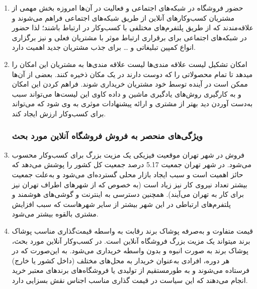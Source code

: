 \documentclass[14pt]{article}
\begin{document}
\begin{flushright}
\begin{enumerate}
\item حضور فروشگاه در شبکه‌های اجتماعی و فعالیت در آن‌ها
\newline
امروزه بخش مهمی از مشتریان کسب‌وکارهای آنلاین از طریق شبکه‌های اجتماعی فراهم می‌شوند و علاقه‌مندند که از طریق پلتفرم‌های مختلفی با کسب‌وکار در ارتباط باشند؛‌ لذا حضور در شبکه‌های اجتماعی برای برقراری ارتباط موثر با مشتریان فعلی و نیز برگزاری انواع کمپین تبلیغاتی و … برای جذب مشتریان جدید اهمیت دارد.
\item امکان تشکیل لیست علاقه مندی‌ها 
\newline
لیست علاقه مندی‌ها به مشتریان این امکان را میدهد تا تمام محصولاتی را که دوست دارند در یک مکان ذخیره کنند. بعضی از آن‌ها ممکن است در آینده توسط خود مشتریان خریداری شوند. فراهم کردن این امکان و به کارگیری روش‌های یادگیری ماشین و داده کاوی این لیست‌ها می‌تواند سبب به‌دست آوردن دید بهتر از مشتری و ارائه پیشنهادات موثری به وی شود که می‌تواند برای کسب‌وکار ارزش ایجاد کند.\\


\subsubsection{ویژگی‌های منحصر به فروش فروشگاه آنلاین مورد بحث}


\item فروش در شهر تهران
\newline
موقعیت فیزیکی یک مزیت بزرگ برای کسب‌وکار محسوب می‌شود. در شهر تهران جمعیت 5.17 درصد جمعیت کل کشور را پوشش می‌دهد که حائز اهمیت است و سبب ایجاد بازار محلی گسترده‌ای می‌شود و به‌علت جمعیت بیشتر تعداد نیروی کار نیز زیاد است (به خصوص که از شهرهای اطراف تهران نیز برای کار به تهران می‌آیند). همچنین دسترسی به اینترنت و گوشی‌های هوشمند و پلتفرم‌های ارتباطی در این شهر بیشتر از سایر شهرهاست که سبب افزایش مشتری بالقوه بیشتر می‌شود. 

\item قیمت متفاوت و به‌صرفه پوشاک برند
\newline
رقابت به واسطه قیمت‌گذاری مناسب پوشاک برند میتواند یک مزیت بزرگ فروشگاه آنلاین است. در کسب‌وکار آنلاین مورد بحث، پوشاک برند به صورت انبوه و بدون واسطه خریداری می‌شود. به این‌صورت که در هر دوره، افرادی به‌عنوان خریدار به محل‌های مختلف (داخل کشور یا خارج) فرستاده می‌شوند و به طورمستقیم از تولیدی یا فروشگاه‌های برندهای معتبر خرید انجام می‌دهند که این سیاست در قیمت گذاری مناسب اجناس نقش بسزایی دارد.


\end{enumerate}
\end{flushright}
\end{document}
